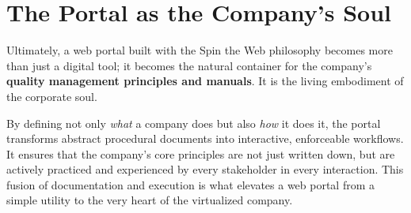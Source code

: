 \section{The Portal as the Company's Soul}
\label{sec:portal-soul}

Ultimately, a web portal built with the Spin the Web philosophy becomes more than just a digital tool; it becomes the natural container for the company's \textbf{quality management principles and manuals}. It is the living embodiment of the corporate soul.

By defining not only \textit{what} a company does but also \textit{how} it does it, the portal transforms abstract procedural documents into interactive, enforceable workflows. It ensures that the company's core principles are not just written down, but are actively practiced and experienced by every stakeholder in every interaction. This fusion of documentation and execution is what elevates a web portal from a simple utility to the very heart of the virtualized company.
